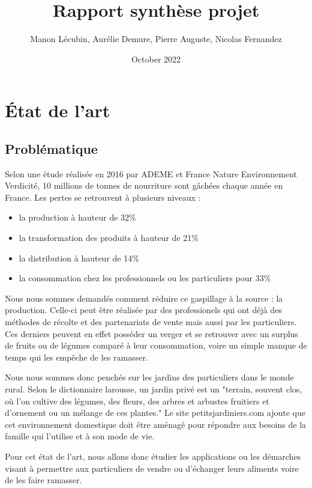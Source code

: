 \documentclass{article}
\title{Rapport synthèse projet}
\author{Manon Lécubin, Aurélie Demure, Pierre Auguste, Nicolas Fernandez}
\date{October 2022}
\begin{document}
\maketitle

\section{État de l'art}

\subsection{Problématique}

Selon une étude réalisée en 2016 par ADEME et France Nature Environnement
Verdicité, 10 millions de tonnes de nourriture sont gâchées chaque
année en France. Les pertes se retrouvent à plusieurs niveaux :
\begin{itemize}
    \item la production à hauteur de 32\%
    \item la transformation des produits à hauteur de 21\%
    \item la distribution à hauteur de 14\%
    \item la consommation chez les professionnels ou les particuliers 
    pour 33\%
\end{itemize}

Nous nous sommes demandés comment réduire ce gaspillage à la source :
la production.
Celle-ci peut être réalisée par des professionels qui ont déjà des 
méthodes de récolte et des partenariats de vente mais aussi par les
particuliers. Ces derniers peuvent en effet posséder un verger et se
retrouver avec un surplus de fruits ou de légumes comparé à leur 
consommation, voire un simple manque de temps qui les empêche de les
ramasser. 

Nous nous sommes donc penchés sur les jardins des particuliers dans 
le monde rural. Selon le dictionnaire larousse, un jardin privé est un
"terrain, souvent clos, où l'on cultive des légumes, des fleurs, des 
arbres et arbustes fruitiers et d'ornement ou un mélange de ces plantes."
Le site petitsjardiniers.com ajoute que cet environnement domestique
doit être aménagé pour répondre aux besoins de la famille qui l'utilise
et à son mode de vie.

Pour cet état de l'art, nous allons donc étudier les applications ou les
démarches visant à permettre aux particuliers de vendre ou d'échanger
leurs aliments voire de les faire ramasser.
\end{document}
